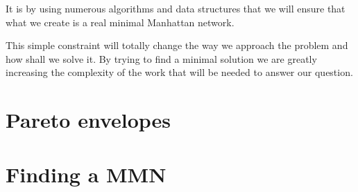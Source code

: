 It is by using numerous algorithms and data structures that we will ensure that what we create is a real minimal Manhattan network.

This simple constraint will totally change the way we approach the problem and how shall we solve it. By trying to find  a minimal solution we are greatly increasing the complexity of the work that will be needed to answer our question.

\section{Pareto envelopes}%

\section{Finding a MMN}%